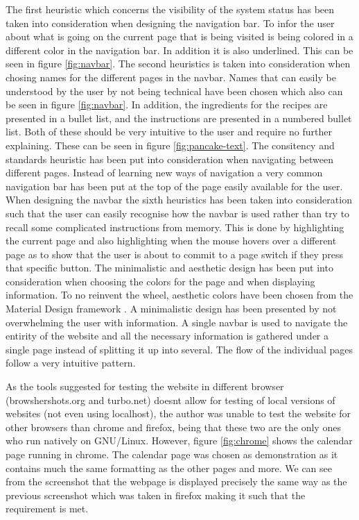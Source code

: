 \documentclass[a4paper]{scrartcl}
\begin{document}
The first heuristic which concerns the visibility of the system status has been taken into consideration when designing the navigation bar. To infor the user about what is going on the current page that is being visited is being colored in a different color in the navigation bar. In addition it is also underlined. This can be seen in figure \ref{fig:navbar}. The second heuristics is taken into consideration when chosing names for the different pages in the navbar. Names that can easily be understood by the user by not being technical have been chosen which also can be seen in figure \ref{fig:navbar}. In addition, the ingredients for the recipes are presented in a bullet list, and the instructions are presented in a numbered bullet list. Both of these should be very intuitive to the user and require no further explaining. These can be seen in figure \ref{fig:pancake-text}. The consitency and standards heuristic has been put into consideration when navigating between different pages. Instead of learning new ways of navigation a very common navigation bar has been put at the top of the page easily available for the user. When designing the navbar the sixth heuristics has been taken into consideration such that the user can easily recognise how the navbar is used rather than try to recall some complicated instructions from memory. This is done by highlighting the current page and also highlighting when the mouse hovers over a different page as to show that the user is about to commit to a page switch if they press that specific button. The minimalistic and aesthetic design has been put into consideration when choosing the colors for the page and when displaying information. To no reinvent the wheel, aesthetic colors have been chosen from the Material Design framework \citet{noauthor_design_nodate}. A minimalistic design has been presented by not overwhelming the user with information. A single navbar is used to navigate the entirity of the website and all the necessary information is gathered under a single page instead of splitting it up into several. The flow of the individual pages follow a very intuitive pattern.

As the tools suggested for testing the website in different browser (browshershots.org and turbo.net) doesnt allow for testing of local versions of websites (not even using localhost), the author was unable to test the website for other browsers than chrome and firefox, being that these two are the only ones who run natively on GNU/Linux. However, figure \ref{fig:chrome} shows the calendar page running in chrome. The calendar page was chosen as demonstration as it contains much the same formatting as the other pages and more. We can see from the screenshot that the webpage is displayed precisely the same way as the previous screenshot which was taken in firefox making it such that the requirement is met.
\end{document}
